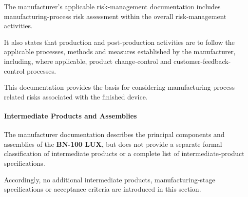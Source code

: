 The manufacturer's applicable risk-management documentation
includes manufacturing-process risk assessment within the overall
risk-management activities.

It also states that production and post-production activities are
to follow the applicable processes, methods and measures established
by the manufacturer, including, where applicable, product
change-control and customer-feedback-control processes.

This documentation provides the basis for considering
manufacturing-process-related risks associated with the finished
device.


\paragraph{Intermediate Products and Assemblies}

The manufacturer documentation describes the principal components
and assemblies of the \textbf{BN-100 LUX}, but does not provide a
separate formal classification of intermediate products or a
complete list of intermediate-product specifications.

Accordingly, no additional intermediate products, manufacturing-stage
specifications or acceptance criteria are introduced in this
section.





